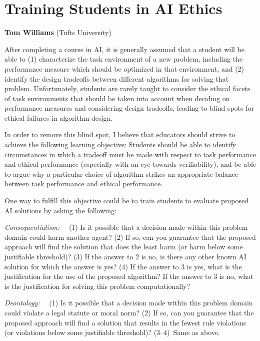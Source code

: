 \documentclass[letterpaper]{article}
\begin{document}
\section{Training Students in AI Ethics}
\begin{center}
{\bf Tom Williams} (Tufts University)
\end{center}

After completing a course in AI, it is generally assumed that a student will be able to (1) characterize the task environment of a new problem, including the performance measure which should be optimized in that environment, and (2) identify the design tradeoffs between different algorithms for solving that problem. Unfortunately, students  are rarely taught to consider the ethical facets of task environments that should be taken into account when deciding on performance measures and considering design tradeoffs, leading to blind spots for ethical failures in algorithm design.

In order to remove this blind spot, I believe that educators should strive to achieve the following learning objective: Students should be able to identify   circumstances in which a tradeoff must be made with respect to task performance and ethical performance (especially with an eye towards verifiability), and be able to argue why a particular choice of algorithm strikes an appropriate balance between task performance and ethical performance.

One way to fulfill this objective could be to train students to evaluate proposed AI solutions by asking the following: 


{\em Consequentialism:}~~
     (1) Is it possible that a decision made within this problem domain
        could harm another agent?
     (2) If so, can you guarantee that the proposed approach will find the
        solution that does the least harm (or harm below
        some justifiable threshold)?
     (3) If the answer to 2 is no, is there any other
        known AI solution for which the answer is yes?
     (4) If the answer to 3 is yes, what is the justification for the
        use of the proposed algorithm? If the answer to 3 is no,
        what is the justification for solving this problem computationally?

{\em Deontology:}~~
     (1) Is it possible that a decision made within this problem domain
        could violate a legal statute or moral norm?
     (2) If so, can you guarantee that the proposed approach will find
        a solution that results in the fewest rule violations (or violations below some justifiable threshold)?
     \mbox{(3--4)}~Same as above.
     
\end{document}
